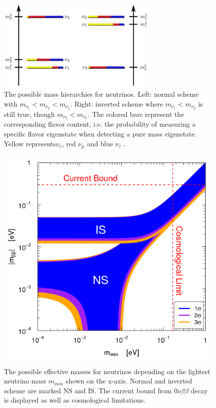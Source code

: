     \begin{figure}
    \centering
    \includegraphics[width=0.7\textwidth]{graphics/standardModel/massHierarchy.jpg}
    	 \caption[Neutrino Mass Hierarchy]{The possible mass hierarchies for neutrinos. Left: normal scheme with $m_{\nu_1} < m_{\nu_2} < m_{\nu_3}$. Right: inverted scheme where $m_{\nu_1} < m_{\nu_2}$ is still true, though $m_{\nu_3} < m_{\nu_1}$. The colored bars represent the corresponding flavor content, i.e. the probability of measuring a specific flavor eigenstate when detecting a pure mass eigenstate. Yellow represents$\nu_e$, red $\nu_\mu$ and blue $\nu_\tau$ \cite{neutrinoMassScheme}.}
    	\label{fig:massSchemes}
    \end{figure}
    \begin{figure}
    \centering
    \includegraphics[width = 0.7 \textwidth]{graphics/standardModel/massSchemes.png}
	\caption[Effective Neutrino Mass]{The possible effective masses for neutrinos depending on the lightest neutrino mass $m_{min}$ shown on the x-axis. Normal and inverted scheme are marked NS and IS. The current bound from $0\nu\beta\beta$ decay is displayed as well as cosmological limitations. }
    	\label{fig:massHierarchy}
    \end{figure}

